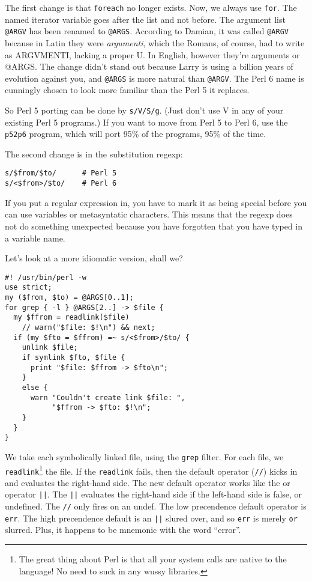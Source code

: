 \documentclass{article}
\newenvironment{example}
  {\addtolength{\linewidth}{-\parindent}%
   \null\begin{minipage}{\linewidth}}
  {\end{minipage}\addtolength{\linewidth}{\parindent}\null}
\begin{document}
The first change is that \verb'foreach' no longer exists.  Now, we
always use \verb'for'.  The named iterator variable goes after the list
and not before.  The argument list \verb'@ARGV' has been renamed to
\verb'@ARGS'.  According to Damian, it was called \verb'@ARGV' because
in Latin they were \textit{argumenti}, which the Romans, of course, had
to write as ARGVMENTI, lacking a proper U.  In English, however they're
arguments or @ARGS.  The change didn't stand out because Larry is using
a billion years of evolution against you, and \verb'@ARGS' is more
natural than \verb'@ARGV'.  The Perl 6 name is cunningly chosen to look
more familiar than the Perl 5 it replaces.  

So Perl 5 porting can be
done by \verb's/V/S/g'.  (Just don't use V in any of your existing Perl
5 programs.)  If you want to move from Perl 5 to Perl 6, use the
\verb'p52p6' program, which will port 95\% of the programs, 95\% of the
time.  

\begin{example}
The second change is in the substitution regexp: 
\begin{verbatim}
s/$from/$to/      # Perl 5 
s/<$from>/$to/    # Perl 6 

\end{verbatim} 
\end{example}
If you
put a regular expression in, you have to mark it as being special before
you can use variables or metasyntatic characters.  This means that the
regexp does not do something unexpected because you have forgotten that
you have typed in a variable name.

\begin{example}
Let's look at a more idiomatic version, shall we?
\begin{verbatim}
#! /usr/bin/perl -w
use strict;
my ($from, $to) = @ARGS[0..1];
for grep { -l } @ARGS[2..] -> $file {
  my $ffrom = readlink($file)
    // warn("$file: $!\n") && next;
  if (my $fto = $ffrom) =~ s/<$from>/$to/ {
    unlink $file;
    if symlink $fto, $file {
      print "$file: $ffrom -> $fto\n";
    }
    else {
      warn "Couldn't create link $file: ",
           "$ffrom -> $fto: $!\n";
    }
  }
}

\end{verbatim}
\end{example}

We take each symbolically linked file, using the \verb'grep' filter.
For each file, we \verb'readlink'\footnote{The great thing about Perl is
that all your system calls are native to the language!  No need to suck
in any wussy libraries.} the file.  If the \verb'readlink' fails, then
the default operator (\verb'//') kicks in and evaluates the right-hand
side.  The new default operator works like the or operator \verb'||'.
The \verb'||' evaluates the right-hand side if the left-hand side is
false, or undefined.  The \verb'//' only fires on an undef.  The low
precendence default operator is \verb'err'.  The high precendence default
is an \verb'||' slured over, and so \verb'err' is merely \verb'or'
slurred.  Plus, it happens to be mnemonic with the word ``error''.
\end{document}
